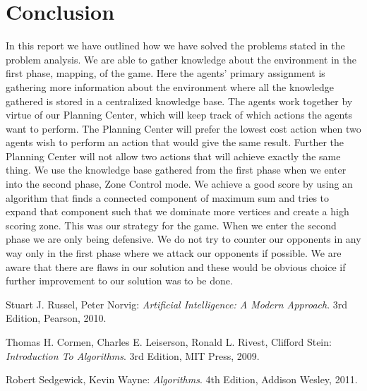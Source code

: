 \documentclass[11pt]{article}
\begin{document}
\section{Conclusion}
In this report we have outlined how we have solved the problems stated in the problem analysis. We are able to gather knowledge about the environment in the first phase, mapping, of the game. Here the agents' primary assignment is gathering more information about the environment where all the knowledge gathered is stored in a centralized knowledge base. The agents work together by virtue of our Planning Center, which will keep track of which actions the agents want to perform. The Planning Center will prefer the lowest cost action when two agents wish to perform an action that would give the same result. Further the Planning Center will not allow two actions that will achieve exactly the same thing. We use the knowledge base gathered from the first phase when we enter into the second phase, Zone Control mode. We achieve a good score by using an algorithm that finds a connected component of maximum sum and tries to expand that component such that we dominate more vertices and create a high scoring zone. This was our strategy for the game. When we enter the second phase we are only being defensive. We do not try to counter our opponents in any way only in the first phase where we attack our opponents if possible. We are aware that there are flaws in our solution and these would be obvious choice if further improvement to our solution was to be done.

\begin{thebibliography}{9}

 	Stuart J. Russel, Peter Norvig:
 	\emph{Artificial Intelligence: A Modern Approach}.
	3rd Edition, 	
	Pearson,
	2010.
	
 	Thomas H. Cormen, Charles E. Leiserson, Ronald L. Rivest, Clifford Stein:
	\emph{Introduction To Algorithms}.
	3rd Edition, 	
	MIT Press,
	2009.
	
 	Robert Sedgewick, Kevin Wayne:
	\emph{Algorithms}.
	4th Edition, 	
	Addison Wesley,
	2011.

\end{thebibliography}
\end{document}
